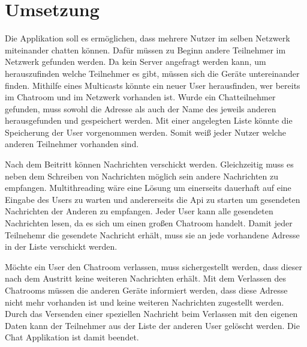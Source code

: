 \section{Umsetzung}
Die Applikation soll es ermöglichen, dass mehrere Nutzer im selben Netzwerk miteinander chatten können. 
Dafür müssen zu Beginn andere Teilnehmer im Netzwerk gefunden werden.
Da kein Server angefragt werden kann, um herauszufinden welche Teilnehmer es gibt, müssen sich die Geräte untereinander finden. Mithilfe eines Multicasts könnte ein neuer User 
herausfinden, wer bereits im Chatroom und im Netzwerk vorhanden ist. 
Wurde ein Chatteilnehmer gefunden, muss sowohl die Adresse als auch der Name des jeweils anderen herausgefunden und gespeichert werden. 
Mit einer angelegten Liste könnte die Speicherung der User vorgenommen werden. Somit weiß jeder Nutzer welche anderen Teilnehmer vorhanden sind. 

Nach dem Beitritt können Nachrichten verschickt werden. 
Gleichzeitig muss es neben dem Schreiben von Nachrichten möglich sein andere Nachrichten zu empfangen. 
Multithreading wäre eine Lösung um einerseits dauerhaft auf eine Eingabe des Users zu warten und andererseits die Api zu starten um gesendeten Nachrichten der Anderen zu empfangen.
Jeder User kann alle gesendeten Nachrichten lesen, da es sich um einen großen Chatroom handelt. 
Damit jeder Teilnehemr die gesendete Nachricht erhält, muss sie an jede vorhandene Adresse in der Liste verschickt werden.

Möchte ein User den Chatroom verlassen, muss sichergestellt werden, dass dieser nach dem Austritt keine weiteren Nachrichten erhält. 
Mit dem Verlassen des Chatrooms müssen die anderen Geräte informiert werden, dass diese Adresse nicht mehr vorhanden ist und keine weiteren Nachrichten zugestellt werden.
Durch das Versenden einer speziellen Nachricht beim Verlassen mit den eigenen Daten kann der Teilnehmer aus der Liste der anderen User gelöscht werden. 
Die Chat Applikation ist damit beendet. 
\\
